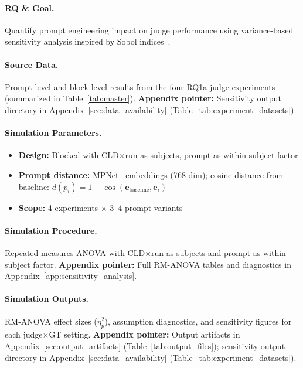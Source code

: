 \paragraph{RQ \& Goal.}
Quantify prompt engineering impact on judge performance using variance-based sensitivity analysis inspired by Sobol indices~\cite{sobol1993sensitivity}.

\paragraph{Source Data.}
Prompt-level and block-level results from the four RQ1a judge experiments (summarized in Table~\ref{tab:master}).
\textbf{Appendix pointer:} Sensitivity output directory in Appendix~\ref{sec:data_availability} (Table~\ref{tab:experiment_datasets}).

\paragraph{Simulation Parameters.}
\begin{itemize}[noitemsep]
    \item \textbf{Design:} Blocked with CLD$\times$run as subjects, prompt as within-subject factor
    \item \textbf{Prompt distance:} MPNet~\cite{song2020mpnet} embeddings (768-dim); cosine distance from baseline: $d(p_i) = 1 - \cos(\mathbf{e}_{\text{baseline}}, \mathbf{e}_i)$
    \item \textbf{Scope:} 4 experiments $\times$ 3--4 prompt variants
\end{itemize}

\paragraph{Simulation Procedure.}
Repeated-measures ANOVA with CLD$\times$run as subjects and prompt as within-subject factor.
\textbf{Appendix pointer:} Full RM-ANOVA tables and diagnostics in Appendix~\ref{app:sensitivity_analysis}.

\paragraph{Simulation Outputs.}
RM-ANOVA effect sizes ($\eta^2_p$), assumption diagnostics, and sensitivity figures for each judge$\times$GT setting.
\textbf{Appendix pointer:} Output artifacts in Appendix~\ref{sec:output_artifacts} (Table~\ref{tab:output_files}); sensitivity output directory in Appendix~\ref{sec:data_availability} (Table~\ref{tab:experiment_datasets}).

